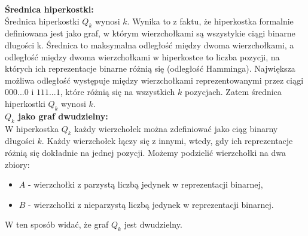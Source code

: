 \documentclass{article}
\begin{document}
\textbf{Średnica hiperkostki:} \\
Średnica hiperkostki $Q_k$ wynosi $k$. Wynika to z faktu, że hiperkostka formalnie definiowana jest jako graf, w którym wierzchołkami są wszystykie ciągi binarne dlugości k.
Średnica to maksymalna odległość między dwoma wierzchołkami, a odległość między dwoma wierzchołkami w hiperkostce to liczba pozycji, na których ich reprezentacje binarne różnią się (odległość Hamminga). 
Największa możliwa odległość występuje między wierzchołkami reprezentowanymi przez ciągi $000...0$ i $111...1$, które różnią się na wszystkich $k$ pozycjach. Zatem średnica hiperkostki $Q_k$ wynosi $k$. \\

\textbf{$Q_{k}$ jako graf dwudzielny:} \\
W hiperkostka $Q_k$ każdy wierzchołek można zdefiniować jako ciąg binarny długości $k$. Każdy wierzchołek łączy się z innymi, 
wtedy, gdy ich reprezentacje różnią się dokładnie na jednej pozycji. Możemy podzielić wierzchołki na dwa zbiory:
\begin{itemize}
    \item $A$ - wierzchołki z parzystą liczbą jedynek w reprezentacji binarnej,
    \item $B$ - wierzchołki z nieparzystą liczbą jedynek w reprezentacji binarnej.
\end{itemize}   
W ten sposób widać, że graf $Q_k$ jest dwudzielny.
\end{document}
